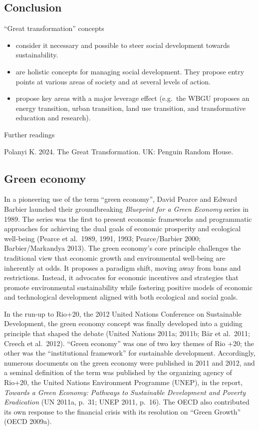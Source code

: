 \documentclass[
  a4paper,
  openany]{book}
\begin{document}
\subsection{Conclusion}\label{conclusion-2}

``Great transformation'' concepts

\begin{itemize}
\item
  consider it necessary and possible to steer social development towards
  sustainability.
\item
  are holistic concepts for managing social development. They propose
  entry points at various areas of society and at several levels of
  action.
\item
  propose key areas with a major leverage effect (e.g.~the WBGU proposes
  an energy transition, urban transition, land use transition, and
  transformative education and research).
\end{itemize}

Further readings

Polanyi K. 2024. The Great Transformation. UK: Penguin Random House.

\subsection{Green economy}\label{green-economy}

In a pioneering use of the term ``green economy'', David Pearce and
Edward Barbier launched their groundbreaking \emph{Blueprint for a Green
Economy} series in 1989. The series was the first to present economic
frameworks and programmatic approaches for achieving the dual goals of
economic prosperity and ecological well-being (Pearce et al.~1989, 1991,
1993; Pearce/Barbier 2000; Barbier/Markandya 2013). The green economy's
core principle challenges the traditional view that economic growth and
environmental well-being are inherently at odds. It proposes a paradigm
shift, moving away from bans and restrictions. Instead, it advocates for
economic incentives and strategies that promote environmental
sustainability while fostering positive models of economic and
technological development aligned with both ecological and social goals.

In the run-up to Rio+20, the 2012 United Nations Conference on
Sustainable Development, the green economy concept was finally developed
into a guiding principle that shaped the debate (United Nations 2011a;
2011b; Bär et al.~2011; Creech et al.~2012). ``Green economy'' was one
of two key themes of Rio +20; the other was the ``institutional
framework'' for sustainable development. Accordingly, numerous documents
on the green economy were published in 2011 and 2012, and a seminal
definition of the term was published by the organizing agency of Rio+20,
the United Nations Environment Programme (UNEP), in the report,
\emph{Towards a Green Economy: Pathways to Sustainable Development and
Poverty Eradication} (UN 2011a, p.~31; UNEP 2011, p.~16). The OECD also
contributed its own response to the financial crisis with its resolution
on ``Green Growth'' (OECD 2009a).
\end{document}
